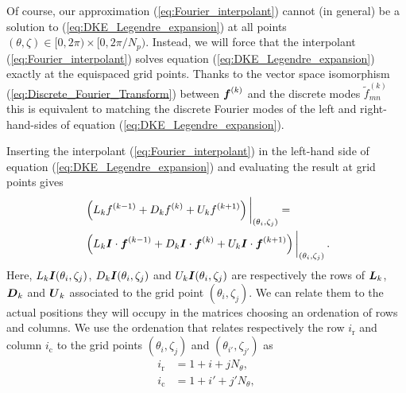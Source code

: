 Of course, our approximation (\ref{eq:Fourier_interpolant}) cannot (in general) be a solution to (\ref{eq:DKE_Legendre_expansion}) at all points $(\theta,\zeta)\in[0,2\pi)\times[0,2\pi/N_p)$. Instead, we will force that the interpolant (\ref{eq:Fourier_interpolant}) solves equation (\ref{eq:DKE_Legendre_expansion}) exactly at the equispaced grid points. Thanks to the vector space isomorphism (\ref{eq:Discrete_Fourier_Transform}) between $\vb*{f}^{(k)}$ and the discrete modes $\tilde{f}_{mn}^{(k)}$ this is equivalent to matching the discrete Fourier modes of the left and right-hand-sides of equation (\ref{eq:DKE_Legendre_expansion}).

Inserting the interpolant (\ref{eq:Fourier_interpolant}) in the left-hand side of equation (\ref{eq:DKE_Legendre_expansion}) and evaluating the result at grid points gives
%
\begin{align}
	& 
	\eval{\left(
		L_k f^{(k-1)} 
		+
		D_k f^{(k)}
		+
		U_k f^{(k+1)}
		\right)}_{(\theta_i,\zeta_j)}
	=
	\nonumber
	\\
	& 
	\eval{\left(
		L_k \vb*{I} \cdot \vb*{f}^{(k-1)} 
		+
		D_k \vb*{I} \cdot \vb*{f}^{(k)}
		+
		U_k \vb*{I} \cdot \vb*{f}^{(k+1)}
		\right)}_{(\theta_i,\zeta_j)}.
\end{align}
Here, $L_k \vb*{I}(\theta_i,\zeta_j)$, $D_k \vb*{I}(\theta_i,\zeta_j)$ and $U_k \vb*{I}(\theta_i,\zeta_j)$ are respectively the rows of $\vb*{L}_k$, $\vb*{D}_k$ and $\vb*{U}_k$ associated to the grid point $(\theta_i,\zeta_j)$. We can relate them to the actual positions they will occupy in the matrices choosing an ordenation of rows and columns. We use the ordenation that relates respectively the row $i_{\text{r}}$ and column $i_{\text{c}}$ to the grid points $(\theta_i,\zeta_j)$ and $(\theta_{i'},\zeta_{j'})$ as
%
\begin{align}
	i_{\text{r}} & = 1 + i + j N_\theta,  \label{eq:Row_ordenation}\\ 
	i_{\text{c}} & = 1 + i' + j' N_\theta, \label{eq:Column_ordenation}
\end{align}
